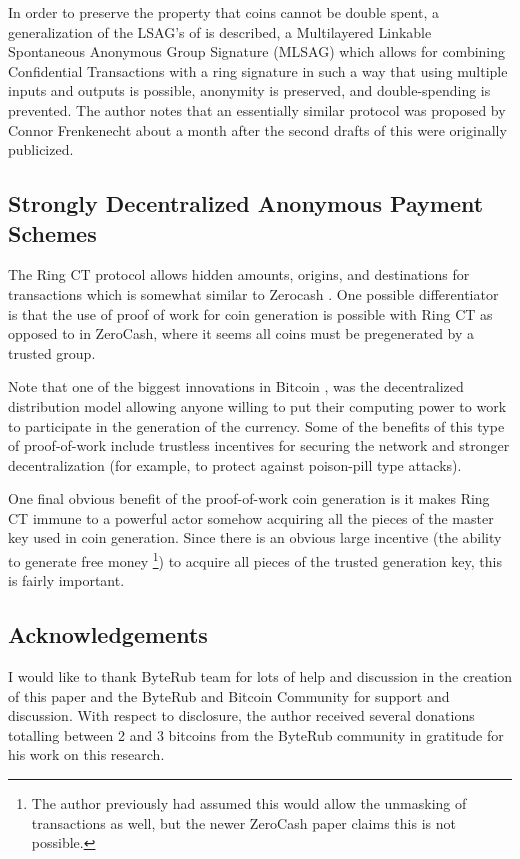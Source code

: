 \documentclass[12pt,english]{mrl}
\theoremstyle{definition}
\numberwithin{equation}{section}
\numberwithin{figure}{section}
\numberwithin{equation}{section}
\numberwithin{equation}{section}
\numberwithin{figure}{section}
\begin{document}
In order to preserve the property that coins cannot be double spent,
a generalization of the LSAG's of \cite{LWW} is described, a Multilayered Linkable
Spontaneous Anonymous Group Signature (MLSAG) which allows for combining
Confidential Transactions with a ring signature in such a way that
using multiple inputs and outputs is possible, anonymity is preserved,
and double-spending is prevented. The author notes that an essentially similar protocol was proposed by Connor Frenkenecht about a month after the second drafts of this were originally publicized. 
\subsection{Strongly Decentralized Anonymous Payment Schemes}
The Ring CT protocol allows hidden amounts, origins, and destinations
for transactions which is somewhat similar to Zerocash \cite{Z}. 
One possible differentiator is that the use of proof of work for coin generation
is possible with Ring CT as opposed to in ZeroCash, where it seems all coins
must be pregenerated by a trusted group.

Note that one of the biggest innovations in Bitcoin \cite{SN}, was
the decentralized distribution model allowing anyone willing to put
their computing power to work to participate in the generation of
the currency. Some of the benefits of this type of proof-of-work include
trustless incentives for securing the network and stronger decentralization (for example, to protect against poison-pill type attacks).  

One final obvious benefit of the proof-of-work coin generation is
it makes Ring CT immune to a powerful actor somehow acquiring all the
pieces of the master key used in coin generation. Since there is an
obvious large incentive (the ability to generate free money \footnote{The author previously had assumed this would allow the unmasking of transactions as well, but the newer ZeroCash paper claims this is not possible.}) to acquire all pieces of the trusted generation
key, this is fairly important. 


\subsection{Acknowledgements}

I would like to thank ByteRub team for lots of help and discussion
in the creation of this paper and the ByteRub and Bitcoin Community
for support and discussion. With respect to disclosure, the author received several donations totalling between 2 and 3 bitcoins from the ByteRub community in gratitude for his work on this research. 
\end{document}
